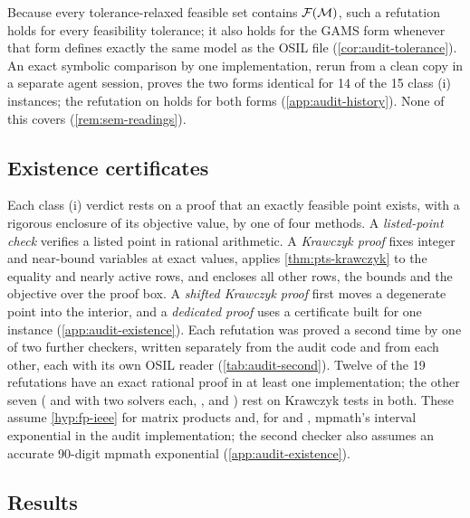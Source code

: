 Because every tolerance-relaxed feasible set contains $\mathcal{F}(\mathcal{M})$, such a refutation holds for every feasibility tolerance; it also holds for the GAMS form whenever that form defines exactly the same model as the OSIL file (\cref{cor:audit-tolerance}).
An exact symbolic comparison by one implementation, rerun from a clean copy in a separate agent session, proves the two forms identical for 14 of the 15 class (i) instances; the refutation on  holds for both forms (\cref{app:audit-history}).
None of this covers  (\cref{rem:sem-readings}).

\subsection{Existence certificates}\label{sec:audit-existence}

Each class (i) verdict rests on a proof that an exactly feasible point exists, with a rigorous enclosure of its objective value, by one of four methods.
A \emph{listed-point check} verifies a listed point in rational arithmetic.
A \emph{Krawczyk proof} fixes integer and near-bound variables at exact values, applies \cref{thm:pts-krawczyk} to the equality and nearly active rows, and encloses all other rows, the bounds and the objective over the proof box.
A \emph{shifted Krawczyk proof} first moves a degenerate point into the interior, and a \emph{dedicated proof} uses a certificate built for one instance (\cref{app:audit-existence}).
Each refutation was proved a second time by one of two further checkers, written separately from the audit code and from each other, each with its own OSIL reader (\cref{tab:audit-second}).
Twelve of the 19 refutations have an exact rational proof in at least one implementation; the other seven ( and  with two solvers each, ,  and ) rest on Krawczyk tests in both.
These assume \cref{hyp:fp-ieee} for matrix products and, for  and , mpmath's interval exponential in the audit implementation; the second checker also assumes an accurate 90-digit mpmath exponential (\cref{app:audit-existence}).

\subsection{Results}\label{sec:audit-results}



